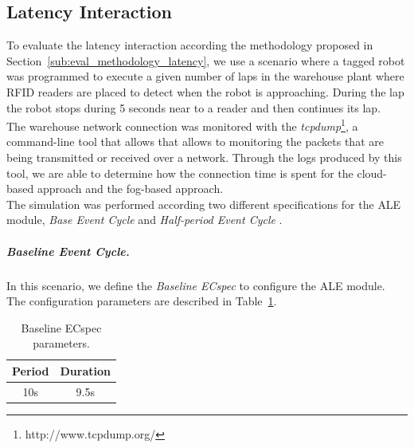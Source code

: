\subsection{Latency Interaction}
\label{sub:eval_exp_latency}
To evaluate the latency interaction according the methodology proposed in Section~\ref{sub:eval_methodology_latency},
we use a scenario where a tagged robot was programmed to execute a given number of laps in the
warehouse plant where \gls{RFID} readers are placed to detect when the robot is approaching.
During the lap the robot stops during 5 seconds near to a reader and then continues its lap.\\

The warehouse network connection was monitored with the \textit{tcpdump}\footnote{http://www.tcpdump.org/},
a command-line tool that allows that allows to monitoring the packets that are being transmitted or
received over a network. Through the logs produced by this tool, we are able to determine how the
connection time is spent for the cloud-based approach and the fog-based approach.\\

The simulation was performed according two different specifications for the \gls{ALE} module,
\textit{Base Event Cycle} and \textit{Half-period Event Cycle} .

\subparagraph{Baseline Event Cycle.}
\label{subp:eval_exp_latency_ecspec}
 In this scenario, we define the \textit{Baseline ECspec} to configure the \gls{ALE} module. The
 configuration parameters are described in Table~\ref{table:ecspec_base}.

 \begin{table}[ht!]
   \begin{tabular}{|c|c|}
     \hline
     Period & Duration \\ \hline
     10s    & 9.5s     \\ \hline
  \end{tabular}
  \caption{Baseline ECspec parameters.}
  \label{table:ecspec_base}
 \end{table}


